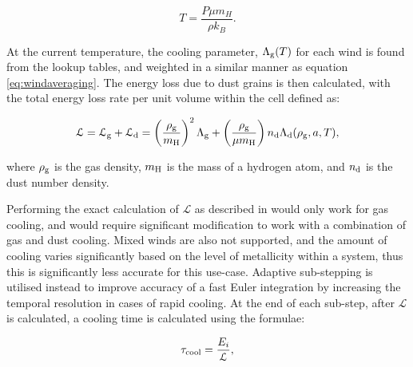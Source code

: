 \begin{equation}
  T = \frac{P \mu m_H}{\rho k_B}.
\end{equation}

\noindent
At the current temperature, the cooling parameter, $\Lambda_\text{g}(T)$ for each wind is found from the lookup tables, and weighted in a similar manner as equation \ref{eq:windaveraging}. The energy loss due to dust grains is then calculated, with the total energy loss rate per unit volume within the cell defined as:


\begin{equation}
  \mathcal{L} = \mathcal{L}_\text{g} + \mathcal{L}_\text{d} = \left(\frac{\rho_\text{g}}{m_\text{H}}\right)^2 \Lambda_\text{g} + \left(\frac{\rho_\text{g}}{\mu m_\text{H}}\right) n_\text{d} \Lambda_\text{d}(\rho_\text{g},a,T),
\end{equation}

\noindent
where $\rho_\text{g}$ is the gas density,
$m_\text{H}$ is the mass of a hydrogen atom,
and
$n_\text{d}$ is the dust number density.


Performing the exact calculation of $\mathcal{L}$ as described in \textcite{townsendExactIntegrationScheme2009} would only work for gas cooling, and would require significant modification to work with a combination of gas and dust cooling.
Mixed winds are also not supported, and the amount of cooling varies significantly based on the level of metallicity within a system, thus this is significantly less accurate for this use-case.
Adaptive sub-stepping is utilised instead to improve accuracy of a fast Euler integration by increasing the temporal resolution in cases of rapid cooling.
At the end of each sub-step, after $\mathcal{L}$ is calculated, a cooling time is calculated using the formulae:

\begin{equation}
  \tau_\text{cool} = \frac{E_i}{\mathcal{L}} ,
\end{equation}


